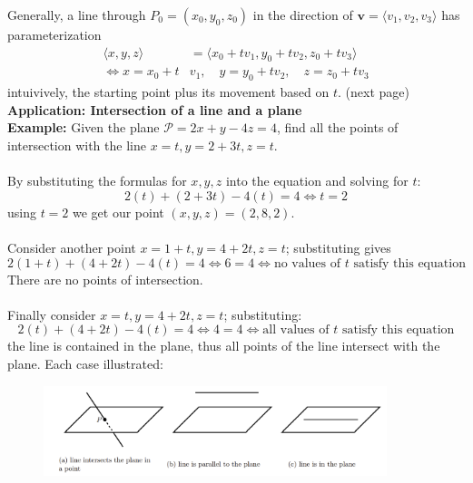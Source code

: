 \documentclass{report}
\begin{document}
Generally, a line through $P_0=(x_0,y_0,z_0)$ in the direction of $\mathbf{v}=
\langle v_1,v_2,v_3\rangle$ has parameterization
\begin{align*}
\langle x,y,z\rangle&=\langle x_0+tv_1,y_0+tv_2,z_0+tv_3\rangle\\
\iff x=x_0+t&v_1,\quad y=y_0+tv_2,\quad z=z_0+tv_3
\end{align*}
intuivively, the starting point plus its movement based on $t$.
(next page)
\newpage
\noindent\textbf{Application: Intersection of a line and a plane}\\
\textbf{Example:} Given the plane $\mathcal{P}=2x+y-4z=4$, find all the points
of intersection with the line $x=t,y=2+3t,z=t$.\\
\vspace{1mm}\\
By substituting the formulas for $x,y,z$ into the equation and solving for $t$:
\begin{equation*}
2(t)+(2+3t)-4(t)=4\iff t=2
\end{equation*}
using $t=2$ we get our point $(x,y,z)=(2,8,2)$.\\
\vspace{1mm}\\
Consider another point $x=1+t,y=4+2t,z=t$; substituting gives
\begin{equation*}
2(1+t)+(4+2t)-4(t)=4\iff 6=4\iff\text{no values of $t$ satisfy this equation}
\end{equation*}
There are no points of intersection.\\
\vspace{1mm}\\
Finally consider $x=t,y=4+2t,z=t$; substituting:
\begin{equation*}
2(t)+(4+2t)-4(t)=4\iff4=4\iff\text{all values of $t$ satisfy this equation}
\end{equation*}
the line is contained in the plane, thus all points of the line intersect with the 
plane. Each case illustrated:
\begin{figure}[h]
\includegraphics[width=10cm]{Capture88}\\
\centering
\end{figure}
\newpage
\end{document}
